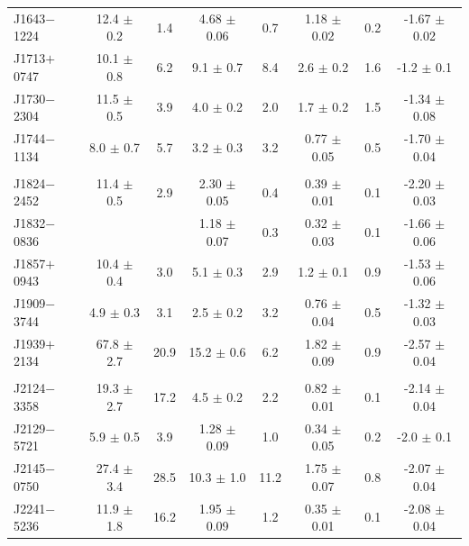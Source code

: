 \documentclass[useAMS,usenatbib]{mn2e}
\begin{document}
\begin{table}
\begin{tabular}{lccccccc}
 J1643$-$1224  &  12.4  $\pm$ 0.2  &  1.4   &  4.68  $\pm$ 0.06 &  0.7  &  1.18 $\pm$ 0.02 &  0.2  &  -1.67 $\pm$ 0.02   \\
 J1713$+$0747  &  10.1  $\pm$ 0.8  &  6.2   &  9.1   $\pm$ 0.7  &  8.4  &  2.6  $\pm$ 0.2  &  1.6  &  -1.2  $\pm$ 0.1  \\
 J1730$-$2304  &  11.5  $\pm$ 0.5  &  3.9   &  4.0   $\pm$ 0.2  &  2.0  &  1.7  $\pm$ 0.2  &  1.5  &  -1.34 $\pm$ 0.08  \\
 J1744$-$1134  &  8.0   $\pm$ 0.7  &  5.7   &  3.2   $\pm$ 0.3  &  3.2  &  0.77 $\pm$ 0.05 &  0.5  &  -1.70 $\pm$ 0.04   \\
               &	                 &        &                   &       &                  &       &                    \\
 J1824$-$2452  &  11.4  $\pm$ 0.5  &  2.9   &  2.30  $\pm$ 0.05 &  0.4  &  0.39 $\pm$ 0.01 &  0.1  &  -2.20 $\pm$ 0.03  \\
 J1832$-$0836  &	                 &        &  1.18  $\pm$ 0.07 &  0.3  &  0.32 $\pm$ 0.03 &  0.1  &  -1.66 $\pm$ 0.06  \\
 J1857$+$0943  &  10.4  $\pm$ 0.4  &  3.0   &  5.1   $\pm$ 0.3  &  2.9  &  1.2  $\pm$ 0.1  &  0.9  &  -1.53 $\pm$ 0.06  \\
 J1909$-$3744  &  4.9   $\pm$ 0.3  &  3.1   &  2.5   $\pm$ 0.2  &  3.2  &  0.76 $\pm$ 0.04 &  0.5  &  -1.32 $\pm$ 0.03   \\
 J1939$+$2134  &  67.8  $\pm$ 2.7  &  20.9  &  15.2  $\pm$ 0.6  &  6.2  &  1.82 $\pm$ 0.09 &  0.9  &  -2.57 $\pm$ 0.04   \\
               &	                 &        &                   &       &                  &       &                     \\
 J2124$-$3358  &  19.3  $\pm$ 2.7  &  17.2  &  4.5   $\pm$ 0.2  &  2.2  &  0.82 $\pm$ 0.01 &  0.1  &  -2.14 $\pm$ 0.04   \\
 J2129$-$5721  &  5.9   $\pm$ 0.5  &  3.9   &  1.28  $\pm$ 0.09 &  1.0  &  0.34 $\pm$ 0.05 &  0.2  &  -2.0  $\pm$ 0.1  \\
 J2145$-$0750  &  27.4  $\pm$ 3.4  &  28.5  &  10.3  $\pm$ 1.0  &  11.2 &  1.75 $\pm$ 0.07 &  0.8  &  -2.07 $\pm$ 0.04  \\
 J2241$-$5236  &  11.9  $\pm$ 1.8  &  16.2  &  1.95  $\pm$ 0.09 &  1.2  &  0.35 $\pm$ 0.01 &  0.1  &  -2.08 $\pm$ 0.04  \\

\end{tabular}
\end{table}
\end{document}
